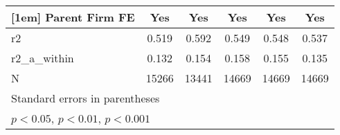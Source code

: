 {\begin{tabular}{l*{5}{c}}
[1em]
Parent Firm FE&         Yes         &         Yes         &         Yes         &         Yes         &         Yes         \\
\hline
r2          &       0.519         &       0.592         &       0.549         &       0.548         &       0.537         \\
r2\_a\_within &       0.132         &       0.154         &       0.158         &       0.155         &       0.135         \\
N           &       15266         &       13441         &       14669         &       14669         &       14669         \\
\hline\hline
\multicolumn{6}{l}{\footnotesize Standard errors in parentheses}\\
\multicolumn{6}{l}{\footnotesize \sym{*} \(p<0.05\), \sym{**} \(p<0.01\), \sym{***} \(p<0.001\)}\\
\end{tabular}
}
